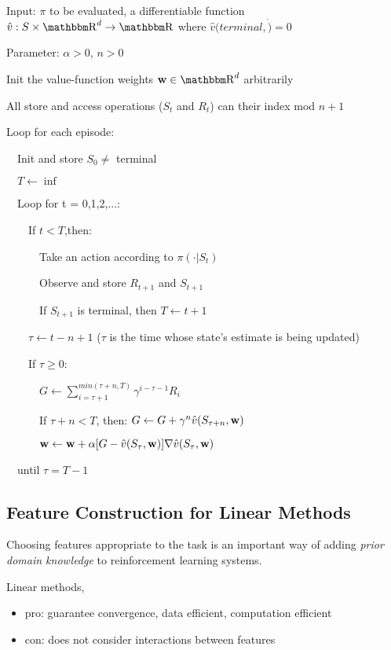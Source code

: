 \documentclass[sutton_barto_notes.tex]{subfiles}
\begin{document}
\begin{tcolorbox}[width=1.1\textwidth,title={n-step semi-gradient TD for estimating $\hat{v}\approx v_\pi$}]
Input: $\pi$ to be evaluated, a differentiable function $\hat{v}:S\times\R^d \rightarrow \R$ where $\hat{v}(terminal,\dot)=0$

Parameter: $\alpha > 0$, $n > 0$

Init the value-function weights ${\bw} \in \R^d$ arbitrarily

All store and access operations ($S_t$ and $R_t$) can their index mod $n+1$

Loop for each episode:

$\quad$Init and store $S_0 \neq$ terminal

$\quad T \leftarrow \inf$

$\quad$Loop for t = 0,1,2,...:

$\quad\quad$If $t<T$,then:

$\quad\quad\quad$Take an action according to $\pi(\cdot|S_t)$

$\quad\quad\quad$Observe and store $R_{t+1}$ and $S_{t+1}$

$\quad\quad\quad$If $S_{t+1}$ is terminal, then $T \leftarrow t+1$

$\quad\quad\tau \leftarrow t-n+1$ ($\tau$ is the time whose state's estimate is being updated)

$\quad\quad$If $\tau \geq 0$:

$\quad\quad\quad G \leftarrow \sum_{i=\tau + 1}^{min(\tau+n,T)} \gamma^{i-\tau-1}R_i$

$\quad\quad\quad$If $\tau + n < T$, then: $G\leftarrow G+\gamma^n \hat{v} (S_{\tau + n}, {\operatorname*{\mathbf{w}}})$

$\quad\quad\quad {\operatorname*{\mathbf{w}}} \leftarrow {\operatorname*{\mathbf{w}}} + \alpha [G - \hat{v}(S_{\tau},{\operatorname*{\mathbf{w}}})]\nabla \hat{v}(S_{\tau},{\operatorname*{\mathbf{w}}})$

$\quad$until $\tau = T-1$
\end{tcolorbox}

\subsection{Feature Construction for Linear Methods}

Choosing features appropriate to the task is an important way of adding \textit{prior domain knowledge} to reinforcement learning systems.

Linear methods,
\begin{itemize}
\item pro: guarantee convergence, data efficient, computation efficient
\item con: does not consider interactions between features
\end{itemize}
\end{document}
